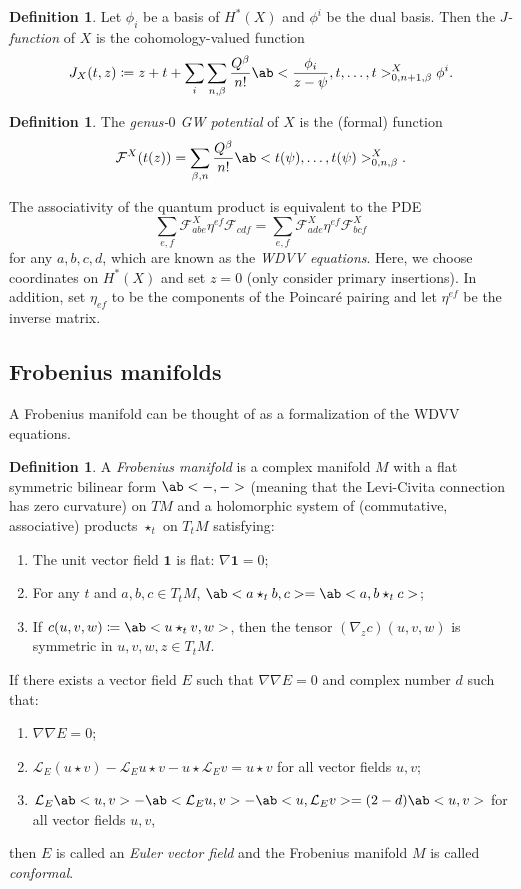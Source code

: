 \documentclass[leqno, openany]{memoir}
\theoremstyle{definition}
\newtheorem{defn}[thm]{Definition}
\theoremstyle{remark}
\theoremstyle{plain}
\theoremstyle{definition}
\theoremstyle{remark}
\newcommand{\mc}[1]{\mathcal{#1}}
\newcommand{\mbf}[1]{\mathbf{#1}}
\begin{document}
\begin{defn}
    Let $\phi_i$ be a basis of $H^*(X)$ and $\phi^i$ be the dual basis. Then the \textit{$J$-function} of $X$ is the cohomology-valued function
    \[ J_X(t,z) \coloneqq z + t + \sum_i \sum_{n,\beta} \frac{Q^{\beta}}{n!} \ab<\frac{\phi_i}{z-\psi}, t, \ldots, t>_{0,n+1,\beta}^X \phi^i. \]
\end{defn}

\begin{defn}
    The \textit{genus-$0$ GW potential} of $X$ is the (formal) function
    \[ \mc{F}^X(t(z)) = \sum_{\beta, n} \frac{Q^{\beta}}{n!} \ab<t(\psi), \ldots, t(\psi)>_{0,n,\beta}^X. \]
\end{defn}

The associativity of the quantum product is equivalent to the PDE
\[ \sum_{e,f} \mc{F}^X_{abe} \eta^{ef} \mc{F}_{cdf} = \sum_{e,f} \mc{F}^X_{ade} \eta^{ef} \mc{F}^X_{bcf} \]
for any $a,b,c,d$, which are known as the \textit{WDVV equations}. Here, we choose coordinates on $H^*(X)$ and set $z=0$ (only consider primary insertions). In addition, set $\eta_{ef}$ to be the components of the Poincar\'e pairing and let $\eta^{ef}$ be the inverse matrix.


\subsection{Frobenius manifolds}

A Frobenius manifold can be thought of as a formalization of the WDVV equations.

\begin{defn}
    A \textit{Frobenius manifold} is a complex manifold $M$ with a flat symmetric bilinear form $\ab<-,->$ (meaning that the Levi-Civita connection has zero curvature) on $TM$ and a holomorphic system of (commutative, associative) products $\star_t$ on $T_t M$ satisfying:
    \begin{enumerate}
        \item The unit vector field $\mbf{1}$ is flat: $\nabla \mbf{1} = 0$;
        \item For any $t$ and $a,b,c \in T_t M$, $\ab<a \star_t b, c> = \ab<a, b \star_t c>$;
        \item If $c(u,v,w) \coloneqq \ab<u \star_t v, w>$, then the tensor $(\nabla_z c)(u,v,w)$ is symmetric in $u,v,w,z \in T_t M$.
    \end{enumerate}
    If there exists a vector field $E$ such that $\nabla \nabla E = 0$ and complex number $d$ such that:
    \begin{enumerate}
        \item $\nabla \nabla E = 0$;
        \item $\mc{L}_E(u \star v) - \mc{L}_E u \star v - u \star \mc{L}_E v = u \star v$ for all vector fields $u,v$;
        \item $\mc{L}_E \ab<u,v> - \ab<\mc{L}_E u,v> - \ab<u,\mc{L}_E v> = (2-d) \ab<u,v>$ for all vector fields $u,v$,
    \end{enumerate}
    then $E$ is called an \textit{Euler vector field} and the Frobenius manifold $M$ is called \textit{conformal}.
\end{defn}
\end{document}
